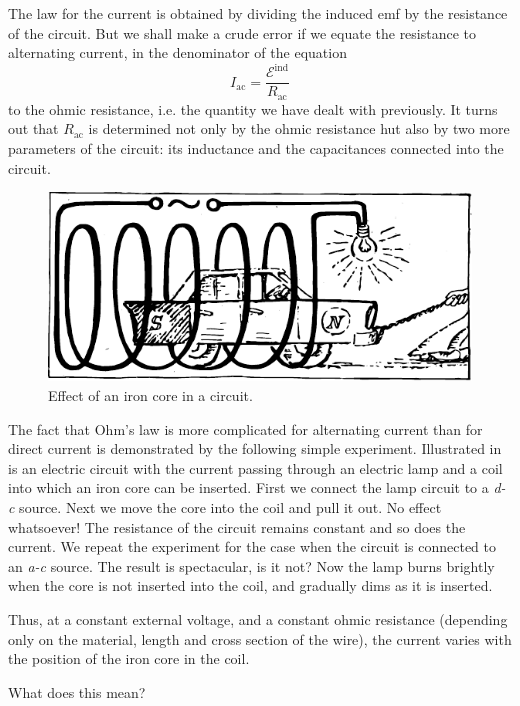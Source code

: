The law for the current is obtained by dividing the induced emf by the resistance of the circuit. But we shall make a crude error if we equate the resistance to alternating current, in the denominator of the equation
\begin{equation*}%
I_{\textrm{ac}} = \frac{\mathcal{E}^{\textrm{ind}}}{R_{\textrm{ac}}}
\end{equation*}
to the ohmic resistance, i.e. the quantity we have dealt with previously. It turns out that $R_{\textrm{ac}}$ is determined not only by the ohmic resistance hut also by two more parameters of the circuit: its inductance and the capacitances connected into the circuit.
\begin{figure}[!ht]
\centering
\includegraphics[width=\textwidth]{figures/fig-04-03.pdf}
\caption{Effect of an iron core in a circuit.}
\label{fig-4.3}
\end{figure}

The fact that Ohm's law is more complicated for alternating current than for direct current is demonstrated by the following simple experiment. Illustrated in  is an electric circuit with the current passing through an electric lamp and a coil into which an iron core can be inserted. First we connect the lamp circuit to a \emph{d-c} source. Next we move the core into the coil and pull it out. No effect whatsoever! The resistance of the circuit remains constant and so does the current. We repeat the experiment for the case when the circuit is connected to an \emph{a-c} source. The result is spectacular, is it not? Now the lamp burns brightly when the core is not inserted into the coil, and gradually dims as it is inserted.

Thus, at a constant external voltage, and a constant ohmic resistance (depending only on the material, length and cross section of the wire), the current varies with the position of the iron core in the coil.

What does this mean?

